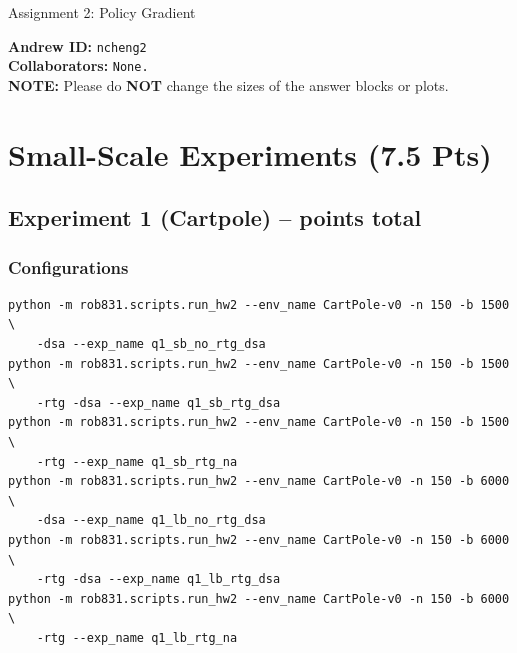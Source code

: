 \documentclass{article}
\begin{document}

\begin{centering}
    {\Large Assignment 2: Policy Gradient} \\
    \vspace{.25cm}
\end{centering}
\vspace{0.25cm}

\textbf{Andrew ID:} \texttt{ncheng2} \\
\textbf{Collaborators:} \texttt{None.}\\ 
\textbf{NOTE:} Please do \textbf{NOT} change the sizes of the answer blocks or plots.

\setcounter{section}{4}
\section{Small-Scale Experiments (7.5 Pts)}

\subsection{Experiment 1 (Cartpole) --  points total\rbrack}

\subsubsection{Configurations}
\begin{answer}[title=Q5.1.1,height=6cm,width=\linewidth]
\begin{verbatim}
python -m rob831.scripts.run_hw2 --env_name CartPole-v0 -n 150 -b 1500 \
    -dsa --exp_name q1_sb_no_rtg_dsa
python -m rob831.scripts.run_hw2 --env_name CartPole-v0 -n 150 -b 1500 \
    -rtg -dsa --exp_name q1_sb_rtg_dsa
python -m rob831.scripts.run_hw2 --env_name CartPole-v0 -n 150 -b 1500 \
    -rtg --exp_name q1_sb_rtg_na
python -m rob831.scripts.run_hw2 --env_name CartPole-v0 -n 150 -b 6000 \
    -dsa --exp_name q1_lb_no_rtg_dsa
python -m rob831.scripts.run_hw2 --env_name CartPole-v0 -n 150 -b 6000 \
    -rtg -dsa --exp_name q1_lb_rtg_dsa
python -m rob831.scripts.run_hw2 --env_name CartPole-v0 -n 150 -b 6000 \
    -rtg --exp_name q1_lb_rtg_na
\end{verbatim}
\end{answer}
\end{document}
